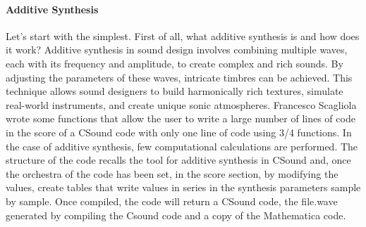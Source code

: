 		\paragraph{Additive Synthesis} Let's start with the simplest.
		First of all, what additive synthesis is and how does it work?
		Additive synthesis in sound design involves combining multiple waves, each with its frequency and amplitude, to create complex and rich sounds. By adjusting the parameters of these waves, intricate timbres can be achieved. This technique allows sound designers to build harmonically rich textures, simulate real-world instruments, and create unique sonic atmospheres.
		Francesco Scagliola wrote some functions that allow the user to write a large number of lines of code in the score of a CSound code with only one line of code using 3/4 functions. In the case of additive synthesis, few computational calculations are performed. 
		The structure of the code recalls the tool for additive synthesis in CSound and, once the orchestra of the code has been set, in the score section, by modifying the values, create tables that write values ​​in series in the synthesis parameters sample by sample. Once compiled, the code will return a CSound code, the file.wave generated by compiling the Csound code and a copy of the Mathematica code.
		
